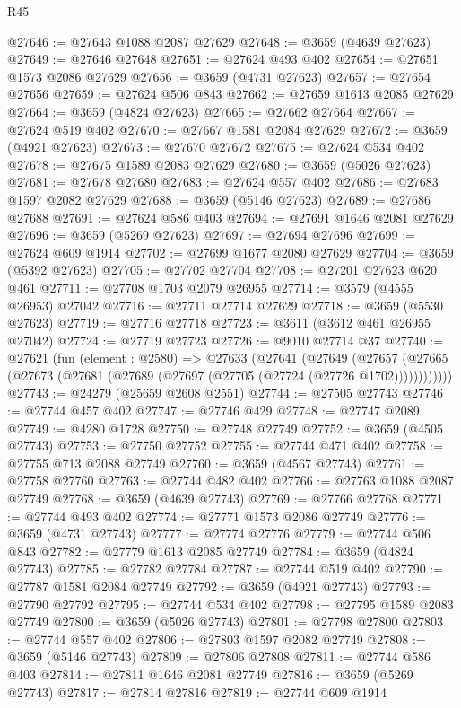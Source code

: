 \begin{lexlean}{R45}
\begin{coremodule}
@27646 := @27643 @1088 @2087 @27629
@27648 := @3659 (@4639 @27623)
@27649 := @27646 @27648
@27651 := @27624 @493 @402
@27654 := @27651 @1573 @2086 @27629
@27656 := @3659 (@4731 @27623)
@27657 := @27654 @27656
@27659 := @27624 @506 @843
@27662 := @27659 @1613 @2085 @27629
@27664 := @3659 (@4824 @27623)
@27665 := @27662 @27664
@27667 := @27624 @519 @402
@27670 := @27667 @1581 @2084 @27629
@27672 := @3659 (@4921 @27623)
@27673 := @27670 @27672
@27675 := @27624 @534 @402
@27678 := @27675 @1589 @2083 @27629
@27680 := @3659 (@5026 @27623)
@27681 := @27678 @27680
@27683 := @27624 @557 @402
@27686 := @27683 @1597 @2082 @27629
@27688 := @3659 (@5146 @27623)
@27689 := @27686 @27688
@27691 := @27624 @586 @403
@27694 := @27691 @1646 @2081 @27629
@27696 := @3659 (@5269 @27623)
@27697 := @27694 @27696
@27699 := @27624 @609 @1914
@27702 := @27699 @1677 @2080 @27629
@27704 := @3659 (@5392 @27623)
@27705 := @27702 @27704
@27708 := @27201 @27623 @620 @461
@27711 := @27708 @1703 @2079 @26955
@27714 := @3579 (@4555 @26953) @27042
@27716 := @27711 @27714 @27629
@27718 := @3659 (@5530 @27623)
@27719 := @27716 @27718
@27723 := @3611 (@3612 @461 @26955 @27042)
@27724 := @27719 @27723
@27726 := @9010 @27714 @37
@27740 := @27621
    (fun (element : @2580) =>
    @27633
      (@27641
        (@27649
          (@27657 (@27665 (@27673 (@27681 (@27689 (@27697 (@27705 (@27724 (@27726 @1702))))))))))))
@27743 := @24279 (@25659 @2608 @2551)
@27744 := @27505 @27743
@27746 := @27744 @457 @402
@27747 := @27746 @429
@27748 := @27747 @2089
@27749 := @4280 @1728
@27750 := @27748 @27749
@27752 := @3659 (@4505 @27743)
@27753 := @27750 @27752
@27755 := @27744 @471 @402
@27758 := @27755 @713 @2088 @27749
@27760 := @3659 (@4567 @27743)
@27761 := @27758 @27760
@27763 := @27744 @482 @402
@27766 := @27763 @1088 @2087 @27749
@27768 := @3659 (@4639 @27743)
@27769 := @27766 @27768
@27771 := @27744 @493 @402
@27774 := @27771 @1573 @2086 @27749
@27776 := @3659 (@4731 @27743)
@27777 := @27774 @27776
@27779 := @27744 @506 @843
@27782 := @27779 @1613 @2085 @27749
@27784 := @3659 (@4824 @27743)
@27785 := @27782 @27784
@27787 := @27744 @519 @402
@27790 := @27787 @1581 @2084 @27749
@27792 := @3659 (@4921 @27743)
@27793 := @27790 @27792
@27795 := @27744 @534 @402
@27798 := @27795 @1589 @2083 @27749
@27800 := @3659 (@5026 @27743)
@27801 := @27798 @27800
@27803 := @27744 @557 @402
@27806 := @27803 @1597 @2082 @27749
@27808 := @3659 (@5146 @27743)
@27809 := @27806 @27808
@27811 := @27744 @586 @403
@27814 := @27811 @1646 @2081 @27749
@27816 := @3659 (@5269 @27743)
@27817 := @27814 @27816
@27819 := @27744 @609 @1914

\end{coremodule}
\end{lexlean}
